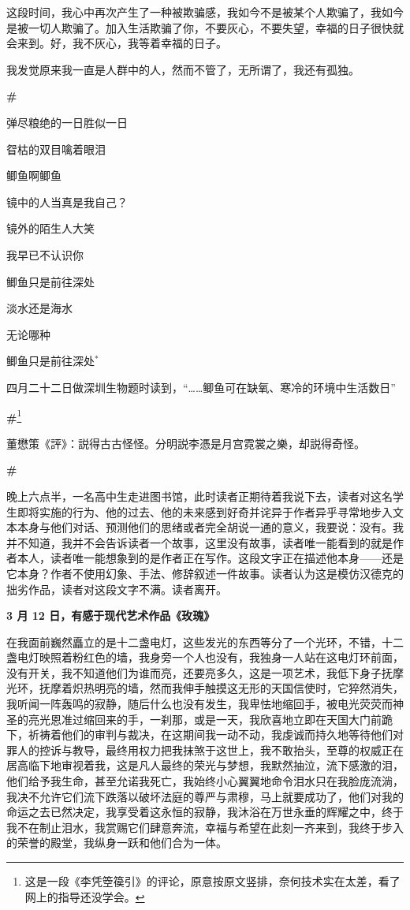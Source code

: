 \documentclass{ctexbook}
\begin{document}
    这段时间，我心中再次产生了一种被欺骗感，我如今不是被某个人欺骗了，我如今是被一切人欺骗了。加入生活欺骗了你，不要灰心，不要失望，幸福的日子很快就会来到。好，我不灰心，我等着幸福的日子。

    我发觉原来我一直是人群中的人，然而不管了，无所谓了，我还有孤独。

\newpage
\textbf{\#}


\mbox


    弹尽粮绝的一日胜似一日

    眢枯的双目噙着眼泪

    鲫鱼啊鲫鱼

    镜中的人当真是我自己？

    镜外的陌生人大笑

    我早已不认识你

    鲫鱼只是前往深处

    淡水还是海水

    无论哪种

    鲫鱼只是前往深处\(^*\)


\mbox


    {\normalsize *四月二十二日做深圳生物题时读到，“……鲫鱼可在缺氧、寒冷的环境中生活数日”}


\newpage
\textbf{\#}\footnote{\normalsize 这是一段《李凭箜篌引》的评论，原意按原文竖排，奈何技术实在太差，看了网上的指导还没学会。}


\mbox


    董懋策《評》：説得古古怪怪。分明説李憑是月宫霓裳之樂，却説得奇怪。

\newpage
\textbf{\#}


\mbox


    晚上六点半，一名高中生走进图书馆，此时读者正期待着我说下去，读者对这名学生即将实施的行为、他的过去、他的未来感到好奇并诧异于作者异乎寻常地步入文本本身与他们对话、预测他们的思绪或者完全胡说一通的意义，我要说：没有。我并不知道，我并不会告诉读者一个故事，这里没有故事，读者唯一能看到的就是作者本人，读者唯一能想象到的是作者正在写作。这段文字正在描述他本身——还是它本身？作者不使用幻象、手法、修辞叙述一件故事。读者认为这是模仿汉德克的拙劣作品，读者对这段文字不满。读者离开。

\newpage
\textbf{3 月 12 日，有感于现代艺术作品《玫瑰》}


    在我面前巍然矗立的是十二盏电灯，这些发光的东西等分了一个光环，不错，十二盏电灯映照着粉红色的墙，我身旁一个人也没有，我独身一人站在这电灯环前面，没有开关，我不知道他们为谁而亮，还要亮多久，这是一项艺术，我低下身子抚摩光环，抚摩着炽热明亮的墙，然而我伸手触摸这无形的天国信使时，它猝然消失，我听闻一阵轰鸣的寂静，随后什么也没有发生，我卑怯地缩回手，被电光荧荧而神圣的亮光恩准过缩回来的手，一刹那，或是一天，我欣喜地立即在天国大门前跪下，祈祷着他们的审判与裁决，在这期间我一动不动，我虔诚而持久地等待他们对罪人的控诉与教导，最终用权力把我抹煞于这世上，我不敢抬头，至尊的权威正在居高临下地审视着我，这是凡人最终的荣光与梦想，我默然抽泣，流下感激的泪，他们给予我生命，甚至允诺我死亡，我始终小心翼翼地命令泪水只在我脸庞流淌，我决不允许它们流下跌落以破坏法庭的尊严与肃穆，马上就要成功了，他们对我的命运之去已然决定，我享受着这永恒的寂静，我沐浴在万世永垂的辉耀之中，终于我不在制止泪水，我赏赐它们肆意奔流，幸福与希望在此刻一齐来到，我终于步入的荣誉的殿堂，我纵身一跃和他们合为一体。
\end{document}
